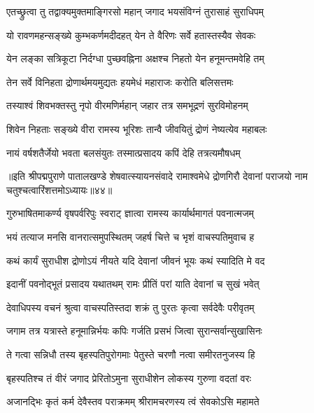 
\twolineshloka
{एतच्छ्रुत्वा तु तद्वाक्यमुक्तमाङ्गिरसो महान्}
{जगाद भयसंविग्नं तुरासाहं सुराधिपम्}%


\twolineshloka
{यो रावणमहन्सङ्ख्ये कुम्भकर्णमदीदहत्}
{येन ते वैरिणः सर्वे हतास्तस्यैव सेवकः}%

\twolineshloka
{येन लङ्का सत्रिकूटा निर्दग्धा पुच्छवह्निना}
{अक्षश्च निहतो येन हनूमन्तमवेहि तम्}%

\twolineshloka
{तेन सर्वे विनिहता द्रोणार्थमयमुद्यतः}
{हयमेधं महाराजः करोति बलिसत्तमः}%

\twolineshloka
{तस्याश्वं शिवभक्तस्तु नृपो वीरमणिर्महान्}
{जहार तत्र समभूद्रणं सुरविमोहनम्}%

\twolineshloka
{शिवेन निहताः सङ्ख्ये वीरा रामस्य भूरिशः}
{तान्वै जीवयितुं द्रोणं नेष्यत्येव महाबलः}%

\twolineshloka
{नायं वर्षशतैर्जेयो भवता बलसंयुतः}
{तस्मात्प्रसादय कपिं देहि तत्रत्यमौषधम्}%

॥इति श्रीपद्मपुराणे पातालखण्डे शेषवात्स्यायनसंवादे रामाश्वमेधे द्रोणगिरौ देवानां पराजयो नाम चतुश्चत्वारिंशत्तमोऽध्यायः॥४४॥



\twolineshloka
{गुरुभाषितमाकर्ण्य वृषपर्वरिपुः स्वराट्}
{ज्ञात्वा रामस्य कार्यार्थमागतं पवनात्मजम्}%

\twolineshloka
{भयं तत्याज मनसि वानरात्समुपस्थितम्}
{जहर्ष चित्ते च भृशं वाचस्पतिमुवाच ह}%


\twolineshloka
{कथं कार्यं सुराधीश द्रोणोऽयं नीयते यदि}
{देवानां जीवनं भूयः कथं स्यादिति मे वद}%

\twolineshloka
{इदानीं पवनोद्भूतं प्रसादय यथातथम्}
{रामः प्रीतिं परां याति देवानां च सुखं भवेत्}%

\twolineshloka
{देवाधिपस्य वचनं श्रुत्वा वाचस्पतिस्तदा}
{शक्रं तु पुरतः कृत्वा सर्वदेवैः परीवृतम्}%

\twolineshloka
{जगाम तत्र यत्रास्ते हनूमान्निर्भयः कपिः}
{गर्जति प्रसभं जित्वा सुरान्सर्वान्सुखासिनः}%

\twolineshloka
{ते गत्वा सन्निधौ तस्य बृहस्पतिपुरोगमाः}
{पेतुस्ते चरणौ नत्वा समीरतनुजस्य हि}%

\twolineshloka
{बृहस्पतिश्च तं वीरं जगाद प्रेरितोऽमुना}
{सुराधीशेन लोकस्य गुरुणा वदतां वरः}%

\twolineshloka
{अजानद्भिः कृतं कर्म देवैस्तव पराक्रमम्}
{श्रीरामचरणस्य त्वं सेवकोऽसि महामते}%

